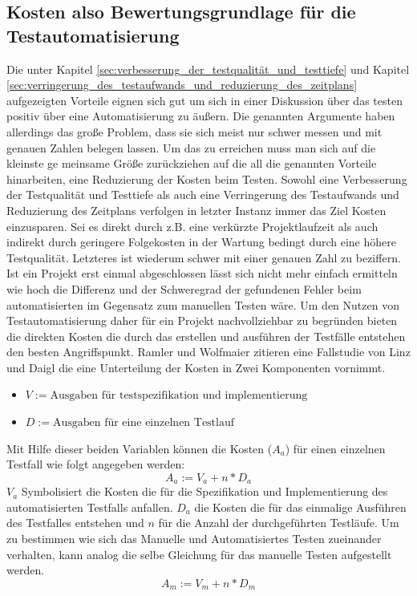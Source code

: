 \subsection{Kosten also Bewertungsgrundlage für die Testautomatisierung}
\label{sec:kosten_der_testautomatisierung}
Die unter Kapitel \ref{sec:verbesserung_der_testqualität_und_testtiefe} und Kapitel \ref{sec:verringerung_des_testaufwands_und_reduzierung_des_zeitplans} aufgezeigten Vorteile eignen sich gut um sich in einer Diskussion über das testen positiv über eine Automatisierung zu äußern. Die genannten Argumente haben allerdings das große Problem, dass sie sich meist nur schwer messen und mit genauen Zahlen belegen lassen.
Um das zu erreichen muss man sich auf die kleinste ge
meinsame Größe zurückziehen auf die all die genannten Vorteile hinarbeiten, eine Reduzierung der Kosten beim Testen.
Sowohl eine Verbesserung der Testqualität und Testtiefe als auch eine Verringerung des Testaufwands und Reduzierung des Zeitplans verfolgen in letzter Instanz immer das Ziel Kosten einzusparen. Sei es direkt durch z.B. eine verkürzte Projektlaufzeit als auch indirekt durch geringere Folgekosten in der Wartung bedingt durch eine höhere Testqualität.
Letzteres ist wiederum schwer mit einer genauen Zahl zu beziffern. Ist ein Projekt erst einmal abgeschlossen lässt sich nicht mehr einfach ermitteln wie hoch die Differenz und der Schweregrad der gefundenen Fehler beim automatisierten im Gegensatz zum manuellen Testen wäre.
Um den Nutzen von Testautomatisierung daher für ein Projekt nachvollziehbar zu begründen bieten die direkten Kosten die durch das erstellen und ausführen der Testfälle entstehen den besten Angriffspunkt. \cite{ramler_economic_2006}
Ramler und Wolfmaier \cite{ramler_economic_2006} zitieren eine Fallstudie von Linz und Daigl \cite{dustin_automated_1999} die eine Unterteilung der Kosten in Zwei Komponenten vornimmt.
\begin{itemize}
    \item[] \(V:=\text{Ausgaben für testspezifikation und implementierung}\)
    \item[] \(D:=\text{Ausgaben für eine einzelnen Testlauf}\)
\end{itemize}

Mit Hilfe dieser beiden Variablen können die Kosten (\(A_a\)) für einen einzelnen Testfall wie folgt angegeben werden:
\begin{equation}
A_a:=V_a+n*D_a
\end{equation}
\(V_a\) Symbolisiert die Kosten die für die Spezifikation und Implementierung des automatisierten Testfalls anfallen. \(D_a\) die Kosten die für das einmalige Ausführen des Testfalles entstehen und \(n\) für die Anzahl der durchgeführten Testläufe.
Um zu bestimmen wie sich das Manuelle und Automatisiertes Testen zueinander verhalten, kann analog die selbe Gleichung für das manuelle Testen aufgestellt werden.
\begin{equation}
A_m:=V_m+n*D_m
\end{equation}


